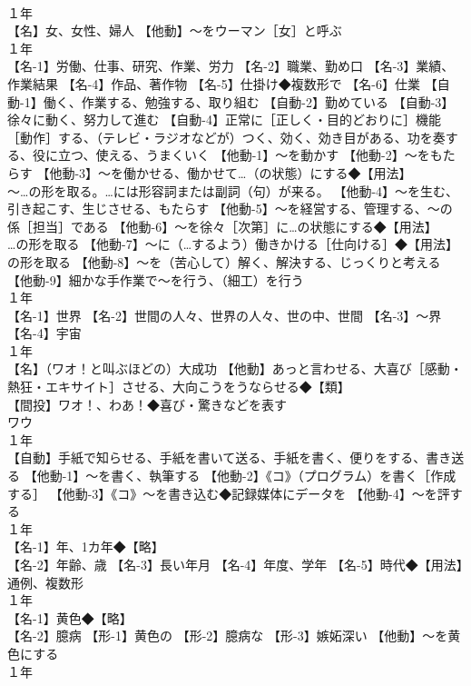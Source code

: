 \documentclass[8pt]{extreport}
\begin{document}
\begin{CJK}{UTF8}{min}
\\	１年	
\\	【名】女、女性、婦人 【他動】～をウーマン［女］と呼ぶ
\\	１年	
\\	【名-1】労働、仕事、研究、作業、労力 【名-2】職業、勤め口 【名-3】業績、作業結果 【名-4】作品、著作物 【名-5】仕掛け◆複数形で 【名-6】仕業 【自動-1】働く、作業する、勉強する、取り組む 【自動-2】勤めている 【自動-3】徐々に動く、努力して進む 【自動-4】正常に［正しく・目的どおりに］機能［動作］する、（テレビ・ラジオなどが）つく、効く、効き目がある、功を奏する、役に立つ、使える、うまくいく 【他動-1】～を動かす 【他動-2】～をもたらす 【他動-3】～を働かせる、働かせて…（の状態）にする◆【用法】
\\	～…の形を取る。…には形容詞または副詞（句）が来る。 【他動-4】～を生む、引き起こす、生じさせる、もたらす 【他動-5】～を経営する、管理する、～の係［担当］である 【他動-6】～を徐々［次第］に…の状態にする◆【用法】
\\	…の形を取る 【他動-7】～に（…するよう）働きかける［仕向ける］◆【用法】
\\	の形を取る 【他動-8】～を（苦心して）解く、解決する、じっくりと考える 【他動-9】細かな手作業で～を行う、（細工）を行う
\\	１年	
\\	【名-1】世界 【名-2】世間の人々、世界の人々、世の中、世間 【名-3】～界 【名-4】宇宙
\\	１年	
\\	【名】（ワオ！と叫ぶほどの）大成功 【他動】あっと言わせる、大喜び［感動・熱狂・エキサイト］させる、大向こうをうならせる◆【類】
\\	【間投】ワオ！、わあ！◆喜び・驚きなどを表す 
\\	ワウ
\\	１年	
\\	【自動】手紙で知らせる、手紙を書いて送る、手紙を書く、便りをする、書き送る 【他動-1】～を書く、執筆する 【他動-2】《コ》（プログラム）を書く［作成する］ 【他動-3】《コ》～を書き込む◆記録媒体にデータを 【他動-4】～を評する
\\	１年	
\\	【名-1】年、1カ年◆【略】
\\	【名-2】年齢、歳 【名-3】長い年月 【名-4】年度、学年 【名-5】時代◆【用法】通例、複数形
\\	１年	
\\	【名-1】黄色◆【略】
\\	【名-2】臆病 【形-1】黄色の 【形-2】臆病な 【形-3】嫉妬深い 【他動】～を黄色にする
\\	１年	

\end{CJK}
\end{document}
